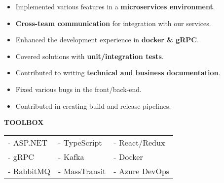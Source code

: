 \documentclass[10pt,a4paper,ragged2e]{altacv}
\begin{document}

\personalinfo{%
	
}

\begin{fullwidth}
	\makecvheader
\end{fullwidth}




\begin{itemize}
	\item Implemented various features in a \textbf{microservices environment}.
	\item \textbf{Cross-team communication} for integration with our services.
	\item Enhanced the development experience in \textbf{docker \& gRPC}.
	\item Covered solutions with \textbf{unit/integration tests}.
	\item Contributed to writing \textbf{technical and business documentation}.
	\item Fixed various bugs in the front/back-end.
	\item Contributed in creating build and release pipelines.
\end{itemize}

\smallskip
\textcolor{VividPurple}{\textbf{TOOLBOX}}
\medskip

\begin{tabular}{ l l l }
	- ASP.NET  & - TypeScript  & - React/Redux  \\
	- gRPC     & - Kafka       & - Docker       \\
	- RabbitMQ & - MassTransit & - Azure DevOps \\
\end{tabular}
\end{document}
